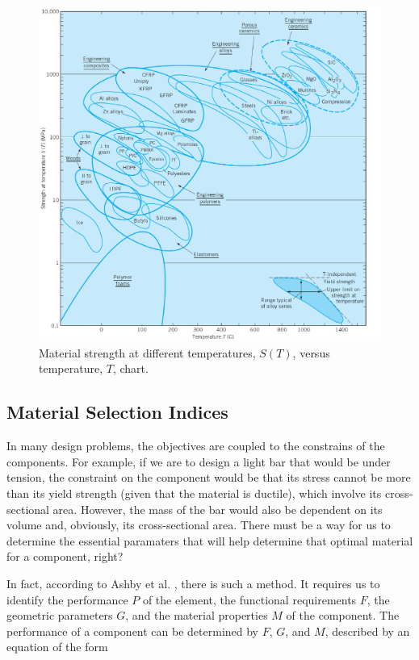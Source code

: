 \documentclass[
10pt,
a4paper,
openany,
svgnames,
]{book}
\begin{document}
\begin{figure}[h]
  \centering
  \includegraphics[scale=0.82]{pictures/Material-selection/strength-temperature-diagram}
  \caption{Material strength at different temperatures, $S(T)$, versus temperature, $T$, chart. \cite{ashby2010materials}}
  \label{fig: strength temperature diagram}
\end{figure}

\subsection{Material Selection Indices}

In many design problems, the objectives are coupled to the constrains of the components. For example, if we are to design a light bar that would be under tension, the constraint on the component would be that its stress cannot be more than its yield strength (given that the material is ductile), which involve its cross-sectional area. However, the mass of the bar would also be dependent on its volume and, obviously, its cross-sectional area. There must be a way for us to determine the essential paramaters that will help determine that optimal material for a component, right?

In fact, according to Ashby et al. \cite{ashby2010materials}, there is such a method. It requires us to identify the performance $P$ of the element, the functional requirements $F$, the geometric parameters $G$, and the material properties $M$ of the component. The performance of a component can be determined by $F$, $G$, and $M$, described by an equation of the form
\end{document}
